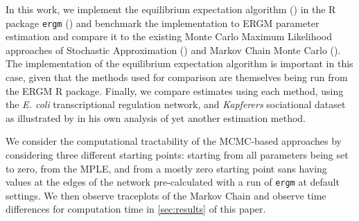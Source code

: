 In this work, we implement the equilibrium expectation algorithm (\cite{eqexpectation}) in the R package \texttt{ergm} (\cite{ergm}) and benchmark the implementation to ERGM parameter estimation and compare it to the existing Monte Carlo Maximum Likelihood approaches of  Stochastic Approximation (\cite{snijders2002}) and Markov Chain Monte Carlo (\cite{geyerthompson1992}). The implementation of the equilibrium expectation algorithm is important in this case, given that the methods used for comparison are themselves being run from the ERGM R package. Finally, we compare estimates using each method, using the \textit{E. coli} transcriptional regulation network, and \textit{Kapferers} sociational dataset as illustrated by \cite{hummels2012} in his own analysis of yet another estimation method.

We consider the computational tractability of the MCMC-based approaches by considering three different starting points: starting from all parameters being set to zero, from the MPLE, and from a mostly zero starting point sans having values at the edges of the network pre-calculated with a run of \texttt{ergm} at default settings. We then observe traceplots of the Markov Chain and observe time differences for computation time in \ref{sec:results} of this paper.
